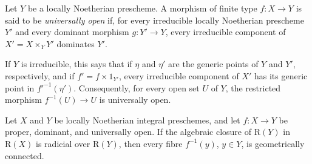 \begin{definition}[4.3.9]
\label{III.4.3.9}
Let $Y$ be a locally Noetherian prescheme.  A morphism of finite type
$f:X\to Y$ is said to be \emph{universally open} if, for every
irreducible locally Noetherian prescheme $Y'$ and every dominant
morphism $g:Y'\to Y$, every irreducible component of
$X'=X\times_Y Y'$ dominates $Y'$.
\end{definition}

If $Y$ is irreducible, this says that if $\eta$ and $\eta'$ are the
generic points of $Y$ and $Y'$, respectively, and if
$f'=f\times 1_{Y'}$, every irreducible component of $X'$ has its
generic point in $f'^{-1}(\eta')$.  Consequently, for every open set
$U$ of $Y$, the restricted morphism $f^{-1}(U)\to U$ is universally
open.

\begin{corollary}[4.3.10]
\label{III.4.3.10}
Let $X$ and $Y$ be locally Noetherian integral preschemes, and let
$f:X\to Y$ be proper, dominant, and universally open.  If the
algebraic closure of $\mathrm{R}(Y)$ in $\mathrm{R}(X)$ is radicial over
$\mathrm{R}(Y)$, then every fibre $f^{-1}(y)$, $y\in Y$, is geometrically
connected.
\end{corollary}

